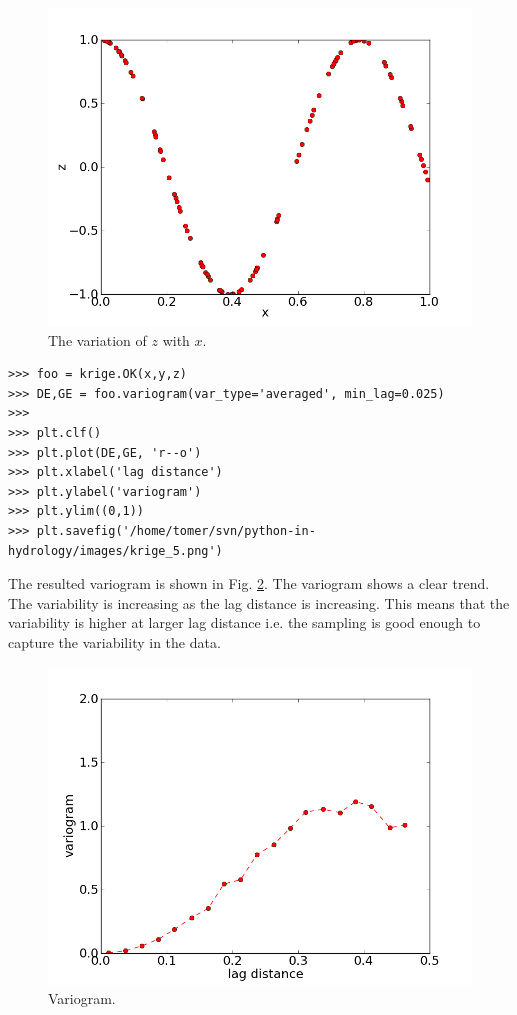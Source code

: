 \documentclass[10pt]{book}
\begin{document}
\beforefig
\begin{figure}[h!]
  \centering
    \includegraphics[scale=0.5]{images/krige_4.png}
  \caption{The variation of $z$ with $x$.}
   \label{fig:krige_4}
\end{figure}
\afterfig


\beforeverb \begin{verbatim}
>>> foo = krige.OK(x,y,z)
>>> DE,GE = foo.variogram(var_type='averaged', min_lag=0.025)
>>> 
>>> plt.clf()
>>> plt.plot(DE,GE, 'r--o')
>>> plt.xlabel('lag distance')
>>> plt.ylabel('variogram')
>>> plt.ylim((0,1))
>>> plt.savefig('/home/tomer/svn/python-in-hydrology/images/krige_5.png')
\end{verbatim} \afterverb

The resulted variogram is shown in Fig. \ref{fig:krige_5}. The variogram shows a clear trend. The variability is increasing as the lag distance is increasing. This means that the variability is higher at larger lag distance i.e. the sampling is good enough to capture the variability in the data. 

\beforefig
\begin{figure}[h!]
  \centering
    \includegraphics[scale=0.5]{images/krige_5.png}
  \caption{Variogram.}
   \label{fig:krige_5}
\end{figure}
\afterfig
\end{document}
